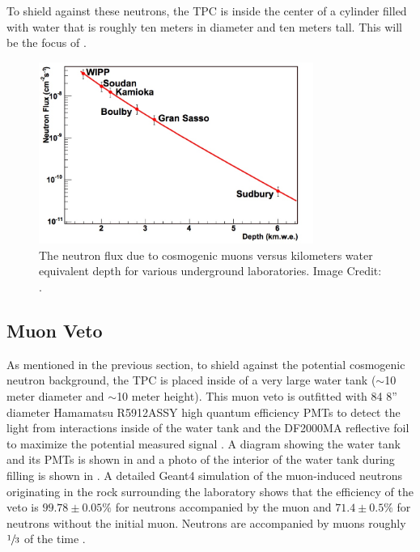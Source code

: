  To shield against these neutrons, the TPC is inside the center of a cylinder filled with water that is roughly ten meters in diameter and ten meters tall.  This will be the focus of . 
 
\begin{figure}[t]
	\centering
	\includegraphics[width=0.8\textwidth]{neutron_flux}
	\caption{The neutron flux due to cosmogenic muons versus kilometers water equivalent depth for various underground laboratories.    Image Credit: .}
	\label{fig:neutron_flux}
\end{figure}
 
 
 \subsection{Muon Veto}
 \label{sec:muon_veto}
 
 As mentioned in the previous section, to shield against the potential cosmogenic neutron background, the TPC is placed inside of a very large water tank ($\sim$10 meter diameter and $\sim$10 meter height).  This muon veto is outfitted with 84 8'' diameter Hamamatsu R5912ASSY high quantum efficiency PMTs to detect the light from interactions inside of the water tank and the DF2000MA reflective foil to maximize the potential measured signal \cite{aprile2014conceptual}.  A diagram showing the water tank and its PMTs is shown in  and a photo of the interior of the water tank during filling is shown in .  A detailed Geant4 simulation \cite{agostinelli2003geant4} of the muon-induced neutrons originating in the rock surrounding the laboratory shows that the efficiency of the veto is $99.78 \pm 0.05 \%$ for neutrons accompanied by the muon and $71.4 \pm 0.5 \%$ for neutrons without the initial muon.  Neutrons are accompanied by muons roughly $\sfrac{1}{3}$ of the time \cite{aprile2014conceptual}.  
 
